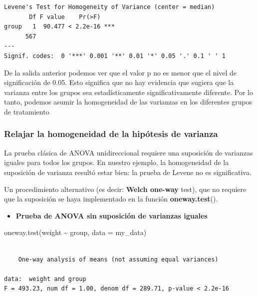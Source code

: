 \documentclass[
  letterpaper,
  DIV=11,
  numbers=noendperiod]{scrartcl}
\newenvironment{Shaded}{\begin{snugshade}}{\end{snugshade}}
\newcommand{\AttributeTok}[1]{\textcolor[rgb]{0.40,0.45,0.13}{#1}}
\newcommand{\FunctionTok}[1]{\textcolor[rgb]{0.28,0.35,0.67}{#1}}
\newcommand{\NormalTok}[1]{\textcolor[rgb]{0.00,0.23,0.31}{#1}}
\newcommand{\SpecialCharTok}[1]{\textcolor[rgb]{0.37,0.37,0.37}{#1}}
\providecommand{\tightlist}{%
  \setlength{\itemsep}{0pt}\setlength{\parskip}{0pt}}\usepackage{longtable,booktabs,array}
\begin{document}
\begin{verbatim}
Levene's Test for Homogeneity of Variance (center = median)
       Df F value    Pr(>F)    
group   1  90.477 < 2.2e-16 ***
      567                      
---
Signif. codes:  0 '***' 0.001 '**' 0.01 '*' 0.05 '.' 0.1 ' ' 1
\end{verbatim}

De la salida anterior podemos ver que el valor p no es menor que el
nivel de significación de 0.05. Esto significa que no hay evidencia que
sugiera que la varianza entre los grupos sea estadísticamente
significativamente diferente. Por lo tanto, podemos asumir la
homogeneidad de las varianzas en los diferentes grupos de tratamiento

\hypertarget{relajar-la-homogeneidad-de-la-hipuxf3tesis-de-varianza}{%
\subsubsection{Relajar la homogeneidad de la hipótesis de
varianza}\label{relajar-la-homogeneidad-de-la-hipuxf3tesis-de-varianza}}

La prueba clásica de ANOVA unidireccional requiere una suposición de
varianzas iguales para todos los grupos. En nuestro ejemplo, la
homogeneidad de la suposición de varianza resultó estar bien: la prueba
de Levene no es significativa.

Un procedimiento alternativo (es decir: \textbf{Welch one-way} test),
que no requiere que la suposición se haya implementado en la función
\textbf{oneway.test}().

\begin{itemize}
\tightlist
\item
  \textbf{Prueba de ANOVA sin suposición de varianzas iguales}
\end{itemize}

\begin{Shaded}
\begin{Highlighting}[]
\FunctionTok{oneway.test}\NormalTok{(weight }\SpecialCharTok{\textasciitilde{}}\NormalTok{ group, }\AttributeTok{data =}\NormalTok{ my\_data)}
\end{Highlighting}
\end{Shaded}

\begin{verbatim}

    One-way analysis of means (not assuming equal variances)

data:  weight and group
F = 493.23, num df = 1.00, denom df = 289.71, p-value < 2.2e-16
\end{verbatim}
\end{document}
